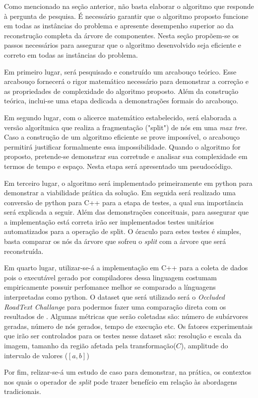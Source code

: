 Como mencionado na seção anterior, não basta elaborar o algoritmo que responde
à pergunta de pesquisa. É necessário garantir que o algoritmo proposto funcione
em todas as instâncias do problema e apresente desempenho superior ao da
reconstrução completa da árvore de componentes. Nesta seção propõem-se os
passos necessários para assegurar que o algoritmo desenvolvido seja eficiente
e correto em todas as instâncias do problema.

Em primeiro lugar, será pesquisado e construído um arcabouço teórico. Esse
arcabouço fornecerá o rigor matemático necessário para demonstrar a
correção e as propriedades de complexidade do algoritmo proposto. Além da
construção teórica, inclui-se uma etapa dedicada a demonstrações formais do
arcabouço.

Em segundo lugar, com o alicerce matemático estabelecido, será elaborada a
versão algorítmica que realiza a fragmentação ("split") de nós em uma
\textit{max tree}. Caso a construção de um algoritmo eficiente se prove
impossível, o arcabouço permitirá justificar formalmente essa impossibilidade.
Quando o algoritmo for proposto, pretende-se demonstrar sua corretude e
analisar sua complexidade em termos de tempo e espaço. Nesta etapa será
apresentado um pseudocódigo.

Em terceiro lugar, o algoritmo será implementado primeiramente em
python para demonstrar a viabilidade prática da solução. Em seguida será realizado
uma conversão de python para C++ para a etapa de testes, a qual sua importância será 
explicada a seguir. Além das demonstrações conceituais, para assegurar que a implementação
está correta irão ser implementados testes unitários automatizados para a operação de split.
O óraculo para estes testes é simples, basta comparar os nós da árvore que sofreu
o \textit{split} com a árvore que será reconstruída.

Em quarto lugar, utilizar-se-á a implementação em C++ para a coleta de dados pois
o executável gerado por compiladores dessa linguagem costumam empiricamente 
possuir perfomance melhor se comparado a línguagens interpretadas como python.
O dataset que será utilizado será o \textit{Occluded RoadText Challange} 
para podermos fazer uma comparação direta com os resultados de \cite{luz_alves_component_2026}.
Algumas métricas que serão coletadas são: número de subárvores geradas, número
de nós gerados, tempo de execução etc. Os fatores experimentais que irão ser
controlados para os testes nesse dataset são: resolução e escala da imagem,
tamanho da região afetada pela transformação($C$), amplitude do intervalo de valores ($[a, b]$)

Por fim, relizar-se-á um estudo de caso para demonstrar, na prática, os
contextos nos quais o operador de \textit{split} pode trazer benefício em
relação às abordagens tradicionais.